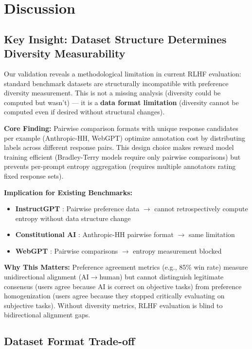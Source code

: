 \section{Discussion}

\subsection{Key Insight: Dataset Structure Determines Diversity Measurability}

Our validation reveals a methodological limitation in current RLHF evaluation: standard benchmark datasets are structurally incompatible with preference diversity measurement. This is not a missing analysis (diversity could be computed but wasn't) — it is a \textbf{data format limitation} (diversity cannot be computed even if desired without structural changes).

\textbf{Core Finding:} Pairwise comparison formats with unique response candidates per example (Anthropic-HH, WebGPT) optimize annotation cost by distributing labels across different response pairs. This design choice makes reward model training efficient (Bradley-Terry models require only pairwise comparisons) but prevents per-prompt entropy aggregation (requires multiple annotators rating fixed response sets).

\textbf{Implication for Existing Benchmarks:}
\begin{itemize}
\item \textbf{InstructGPT} \cite{ouyang2022instructgpt}: Pairwise preference data $\rightarrow$ cannot retrospectively compute entropy without data structure change
\item \textbf{Constitutional AI} \cite{bai2022constitutional}: Anthropic-HH pairwise format $\rightarrow$ same limitation
\item \textbf{WebGPT} \cite{nakano2021webgpt}: Pairwise comparisons $\rightarrow$ entropy measurement blocked
\end{itemize}

\textbf{Why This Matters:} Preference agreement metrics (e.g., 85\% win rate) measure unidirectional alignment (AI$\rightarrow$human) but cannot distinguish legitimate consensus (users agree because AI is correct on objective tasks) from preference homogenization (users agree because they stopped critically evaluating on subjective tasks). Without diversity metrics, RLHF evaluation is blind to bidirectional alignment gaps.

\subsection{Dataset Format Trade-off}

